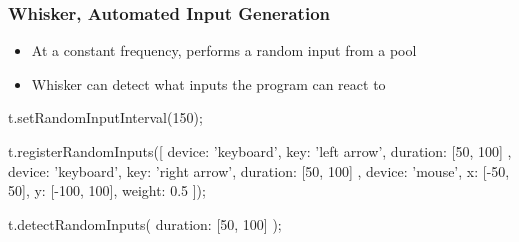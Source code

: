 \begin{frame}[fragile]\frametitle{Whisker, Automated Input Generation}
    \begin{itemize}
        \item At a constant frequency, performs a random input from a pool
        \item Whisker can detect what inputs the program can react to
    \end{itemize}

    \begin{javascriptcode}
        t.setRandomInputInterval(150);

        t.registerRandomInputs([
            { device: 'keyboard', key: 'left arrow', duration: [50, 100] },
            { device: 'keyboard', key: 'right arrow', duration: [50, 100] },
            { device: 'mouse', x: [-50, 50], y: [-100, 100], weight: 0.5 }
        ]);

        t.detectRandomInputs({ duration: [50, 100] });
    \end{javascriptcode}
\end{frame}

\newcommand{\tablebox}[1]{
    \begin{tikzpicture}
         \node[draw, text width=7.5cm, minimum height=0.6cm, rounded corners] {\footnotesize #1};
    \end{tikzpicture}
}

